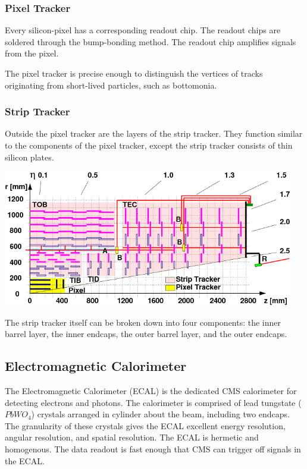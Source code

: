 \subsubsection{Pixel Tracker}

Every silicon-pixel has a corresponding readout chip. The readout chips are soldered through the bump-bonding method. The readout chip amplifies signals from the pixel.

The pixel tracker is precise enough to distinguish the vertices of tracks originating from short-lived particles, such as bottomonia. 

\subsubsection{Strip Tracker}

Outside the pixel tracker are the layers of the strip tracker. They function similar to the components of the pixel tracker, except the strip tracker consists of thin silicon plates. 

\centerline{
\includegraphics[width=5in]{Chapter3/importfigs/cms_cft_09_003_fig1.png}
}

The strip tracker itself can be broken down into four components: the inner barrel layer, the inner endcaps, the outer barrel layer, and the outer endcaps.

\subsection{Electromagnetic Calorimeter}

The Electromagnetic Calorimeter (ECAL) is the dedicated CMS calorimeter for detecting electrons and photons. The calorimeter is comprised of lead tungstate ($PbWO_4$) crystals arranged in cylinder about the beam, including two endcaps. The granularity of these crystals gives the ECAL excellent energy resolution, angular resolution, and spatial resolution. The ECAL is hermetic and homogenous. The data readout is fast enough that CMS can trigger off signals in the ECAL.

